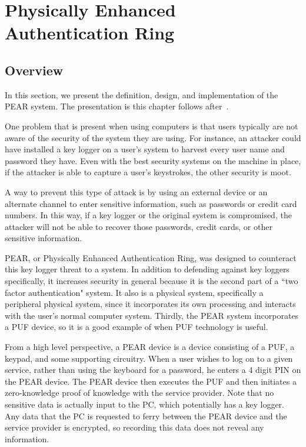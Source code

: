 
\chapter{Physically Enhanced Authentication Ring}
\label{chapter:pear}

\section{Overview}
In this section, we present the definition, design, and implementation of the PEAR system. The presentation is this chapter
follows after~\cite{PEAR}.

One problem that is present when using computers is that users typically are not aware of the security of the system
they are using. For instance, an attacker could have installed a key logger on a user's system to harvest every user name
and password they have. Even with the best security systems on the machine in place, if the attacker is able to capture
a user's keystrokes, the other security is moot. 

A way to prevent this type of attack is by using an external device or an alternate channel to enter sensitive information,
such as passwords or credit card numbers. In this way, if a key logger or the original system is compromised, the attacker
will not be able to recover those passwords, credit cards, or other sensitive information.

PEAR, or Physically Enhanced Authentication Ring, was designed to counteract this key logger threat to a system. In addition
to defending against key loggers specifically, it increases security in general because it is the second part of a ``two factor
authentication" system. It also is a physical system, specifically a peripheral physical system, since it incorporates its
own processing and interacts with the user's normal computer system. Thirdly, the PEAR system incorporates a PUF device,
so it is a good example of when PUF technology is useful.

From a high level perspective, a PEAR device is a device consisting of a PUF, a keypad, and some supporting circuitry. When
a user wishes to log on to a given service, rather than using the keyboard for a password, he enters a 4 digit PIN on the PEAR
device. The PEAR device then executes the PUF and then initiates a zero-knowledge proof of knowledge with the service
provider. Note that no sensitive data is actually input to the PC, which potentially has a key logger. Any data that the PC
is requested to ferry between the PEAR device and the service provider is encrypted, so recording this data does not reveal
any information.

